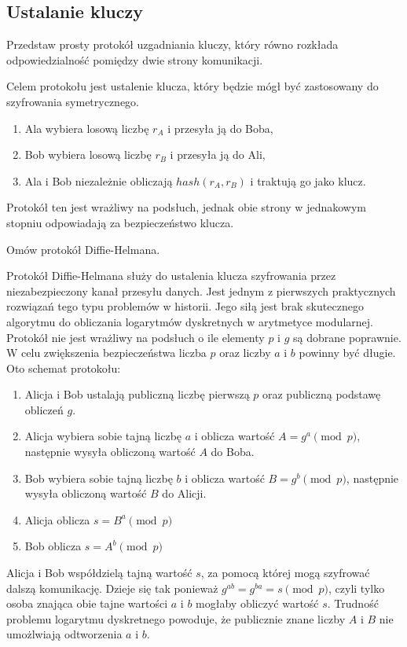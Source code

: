 \documentclass[answers,11pt]{exam}
\begin{document}
\begin{questions}
\end{questions}


\subsection{Ustalanie kluczy}
\begin{questions}

\question Przedstaw prosty protokół uzgadniania kluczy, który równo rozkłada odpowiedzialność pomiędzy dwie strony komunikacji.
\begin{solution}
Celem protokołu jest ustalenie klucza, który będzie mógł być zastosowany do szyfrowania symetrycznego. 
\begin{enumerate}
\item Ala wybiera losową liczbę $r_A$ i przesyła ją do Boba,
\item Bob wybiera losową liczbę $r_B$ i przesyła ją do Ali,
\item Ala i Bob niezależnie obliczają $hash(r_A, r_B)$ i traktują go jako klucz.
\end{enumerate}
Protokół ten jest wrażliwy na podsłuch, jednak obie strony w jednakowym stopniu odpowiadają za bezpieczeństwo klucza.
\end{solution}

\question Omów protokół Diffie-Helmana.
\begin{solution}
Protokół Diffie-Helmana służy do ustalenia klucza szyfrowania przez niezabezpieczony kanał przesyłu danych. Jest jednym z pierwszych praktycznych rozwiązań tego typu problemów w historii. Jego siłą jest brak skutecznego algorytmu do obliczania logarytmów dyskretnych w arytmetyce modularnej. Protokół nie jest wrażliwy na podsłuch o ile elementy $p$ i $g$ są dobrane poprawnie. W celu zwiększenia bezpieczeństwa liczba $p$ oraz liczby $a$ i $b$ powinny być długie. Oto schemat protokołu:
\begin{enumerate}
\item Alicja i Bob ustalają publiczną liczbę pierwszą $p$ oraz publiczną podstawę obliczeń $g$.
\item Alicja wybiera sobie tajną liczbę $a$ i oblicza wartość $A=g^{a} \pmod{p}$, następnie wysyła obliczoną wartość $A$ do Boba.
\item Bob wybiera sobie tajną liczbę $b$ i oblicza wartość $B=g^{b} \pmod{p}$, następnie wysyła obliczoną wartość $B$ do Alicji.
\item Alicja oblicza $s=B^{a} \pmod{p}$
\item Bob oblicza $s=A^{b} \pmod{p}$
\end{enumerate}
Alicja i Bob współdzielą tajną wartość $s$, za pomocą której mogą szyfrować dalszą komunikację. Dzieje się tak ponieważ $g^{ab}=g^{ba}=s \pmod{p}$, czyli tylko osoba znająca obie tajne wartości $a$ i $b$ mogłaby obliczyć wartość $s$. Trudność problemu logarytmu dyskretnego powoduje, że publicznie znane liczby $A$ i $B$ nie umożlwiają odtworzenia $a$ i $b$.
\end{solution}


\end{questions}
\end{document}
